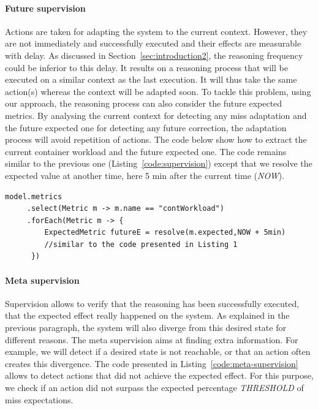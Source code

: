\paragraph{Future supervision}
Actions are taken for adapting the system to the current context.
However, they are not immediately and successfully executed and their effects are measurable with delay.
As discussed in Section~\ref{sec:introduction2}, the reasoning frequency could be inferior to this delay.
It results on a reasoning process that will be executed on a similar context as the last execution.
It will thus take the same action(s) whereas the context will be adapted soon.
To tackle this problem, using our approach, the reasoning process can also consider the future expected metrics.
By analysing the current context for detecting any miss adaptation and the future expected one for detecting any future correction, the adaptation process will avoid repetition of actions.
The code below show how to extract the current container workload and the future expected one.
The code remains similar to the previous one (Listing~\ref{code:supervision}) except that we resolve the expected value at another time, here 5 min after the current time (\textit{NOW}).

\begin{lstlisting}[style=customc,caption=Extraction of expected and measured value of a metric with a delta time,label=code:supervision-future,basicstyle=\scriptsize]
model.metrics
     .select(Metric m -> m.name == "contWorkload")
     .forEach(Metric m -> {
         ExpectedMetric futureE = resolve(m.expected,NOW + 5min)
         //similar to the code presented in Listing 1
      })
\end{lstlisting}

\paragraph{Meta supervision}

Supervision allows to verify that the reasoning has been successfully executed, \ie that the expected effect really happened on the system.
As explained in the previous paragraph, the system will also diverge from this desired state for different reasons.
The meta supervision aims at finding extra information.
For example, we will detect if a desired state is not reachable, or that an action often creates this divergence.
The code presented in Listing~\ref{code:meta-supervision} allows to detect actions that did not achieve the expected effect.
For this purpose, we check if an action did not surpass the expected percentage \textit{THRESHOLD} of miss expectations.

